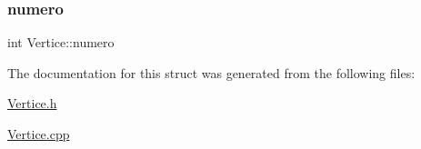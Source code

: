 \mbox{\label{structVertice_a20682b863309e4bac1916f4b71586a48}} 
\subsubsection{\texorpdfstring{numero}{numero}}
{\footnotesize\ttfamily int Vertice\+::numero}



The documentation for this struct was generated from the following files\+:\begin{DoxyCompactItemize}
\item 
\hyperlink{Vertice_8h}{Vertice.\+h}\item 
\hyperlink{Vertice_8cpp}{Vertice.\+cpp}\end{DoxyCompactItemize}
